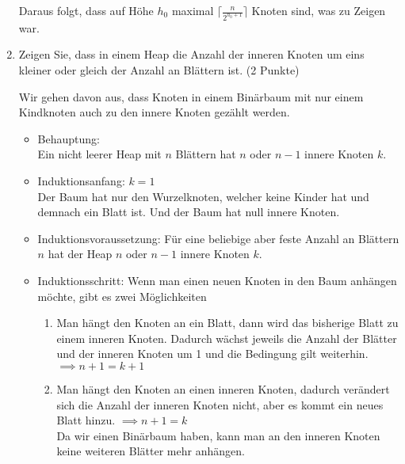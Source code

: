 \documentclass[ngerman,landscape,twocolumn]{adtexsheet}
\begin{document}
\begin{question}
\begin{enumerate}
    Daraus folgt, dass auf Höhe $h_0$ maximal $\lceil \frac{n}{2^{h_0+1}} \rceil$ Knoten sind, was zu Zeigen war.

    \item Zeigen Sie, dass in einem Heap die Anzahl der inneren Knoten um eins kleiner oder gleich der Anzahl an Blättern ist. (2 Punkte)
    
    Wir gehen davon aus, dass Knoten in einem Binärbaum mit nur einem Kindknoten auch zu den innere Knoten gezählt werden.
    
        \begin{itemize}
            \item Behauptung:\\ Ein nicht leerer Heap mit $n$ Blättern hat $n$ oder $n-1$ innere Knoten $k$.
            \item Induktionsanfang: $k=1$ \\
                Der Baum hat nur den Wurzelknoten, welcher keine Kinder hat und demnach ein Blatt ist. Und der Baum hat null innere Knoten. \checkmark
            \item Induktionsvoraussetzung: Für eine beliebige aber feste Anzahl an Blättern $n$ hat der Heap $n$ oder $n-1$ innere Knoten $k$.
            \item Induktionsschritt: Wenn man einen neuen Knoten in den Baum anhängen möchte, gibt es zwei Möglichkeiten
            \begin{enumerate}
                \item Man hängt den Knoten an ein Blatt, dann wird das bisherige Blatt zu einem inneren Knoten. Dadurch wächst jeweils die Anzahl der Blätter und der inneren Knoten um 1 und die Bedingung gilt weiterhin. $\implies n+1 = k+1$ \checkmark
                \item Man hängt den Knoten an einen inneren Knoten, dadurch verändert sich die Anzahl der inneren Knoten nicht, aber es kommt ein neues Blatt hinzu. $\implies n+1 = k$ \checkmark\\ Da wir einen Binärbaum haben, kann man an den inneren Knoten keine weiteren Blätter mehr anhängen.
            \end{enumerate}
        \end{itemize}
    \end{enumerate}
\end{question}

\newpage
{}
\end{document}
